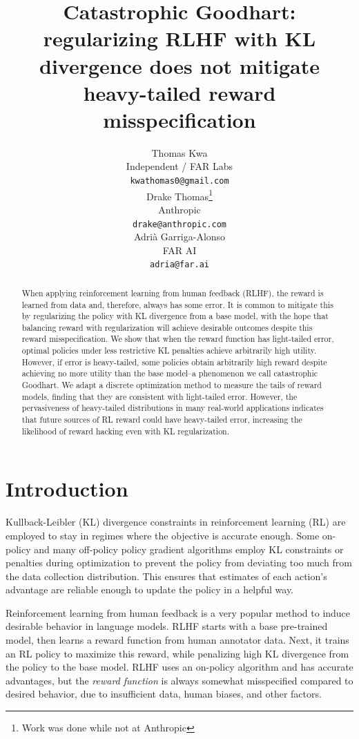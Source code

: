 \documentclass{article}
\title{Catastrophic Goodhart: regularizing RLHF with KL divergence does not mitigate heavy-tailed reward misspecification}
\author{%
  Thomas Kwa \\
  Independent / FAR Labs \\
  \texttt{kwathomas0@gmail.com} \\
  \And
  Drake Thomas\thanks{Work was done while not at Anthropic} \\
  Anthropic \\
  \texttt{drake@anthropic.com} \\
  \And
  Adrià Garriga-Alonso \\
  FAR AI \\
  \texttt{adria@far.ai} \\
}
\begin{document}
\maketitle

 \begin{abstract}
  When applying reinforcement learning from human feedback (RLHF), the reward is learned from data and, therefore, always has some error. It is common to mitigate this by regularizing the policy with KL divergence from a base model, with the hope that balancing reward with regularization will achieve desirable outcomes despite this reward misspecification. We show that when the reward function has light-tailed error, optimal policies under less restrictive KL penalties achieve arbitrarily high utility. However, if error is heavy-tailed, some policies obtain arbitrarily high reward despite achieving no more utility than the base model--a phenomenon we call catastrophic Goodhart. We adapt a discrete optimization method to measure the tails of reward models, finding that they are consistent with light-tailed error. However, the pervasiveness of heavy-tailed distributions in many real-world applications indicates that future sources of RL reward could have heavy-tailed error, increasing the likelihood of reward hacking even with KL regularization.
\end{abstract}

\section{Introduction}

Kullback-Leibler (KL) divergence constraints in reinforcement learning (RL) are employed to stay in regimes where the objective is accurate enough.
Some on-policy \citep{trpo,ppo} and many off-policy \citep{abdolmaleki18mpo,jaques2019way} policy gradient algorithms employ KL constraints or penalties during optimization to prevent the policy from deviating too much from the data collection distribution. This ensures that estimates of each action's advantage are reliable enough to update the policy in a helpful way.

Reinforcement learning from human feedback \citep[RLHF]{rlhf_christiano,ziegler2020finetuning} is a very popular method to induce desirable behavior in language models. RLHF starts with a base pre-trained model, then learns a reward function from human annotator data. Next, it trains an RL policy to maximize this reward, while penalizing high KL divergence from the policy to the base model. RLHF uses an on-policy algorithm and has accurate advantages, but the \emph{reward function} is always somewhat misspecified compared to desired behavior, due to insufficient data, human biases, and other factors.
\end{document}
